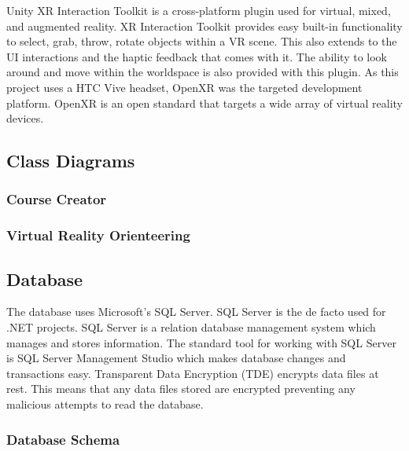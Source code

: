 Unity XR Interaction Toolkit is a cross-platform plugin used for virtual, mixed, and augmented reality. XR Interaction Toolkit provides easy built-in functionality to select, grab, throw, rotate objects within a VR scene. This also extends to the UI interactions and the haptic feedback that comes with it. The ability to look around and move within the worldspace is also provided with this plugin. As this project uses a HTC Vive headset, OpenXR was the targeted development platform. OpenXR is an open standard that targets a wide array of virtual reality devices.

\subsection{Class Diagrams}

\subsubsection{Course Creator}

\subsubsection{Virtual Reality Orienteering}

\subsection{Database}
The database uses Microsoft's SQL Server. SQL Server is the de facto used for .NET projects.  SQL Server is a relation database management system which manages and stores information. The standard tool for working with SQL Server is SQL Server Management Studio which makes database changes and transactions easy. Transparent Data Encryption (TDE) encrypts data files at rest. This means that any data files stored are encrypted preventing any malicious attempts to read the database.

\subsubsection{Database Schema}

